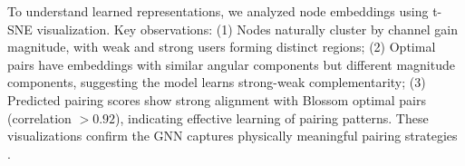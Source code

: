 To understand learned representations, we analyzed node embeddings using t-SNE visualization. Key observations: (1) Nodes naturally cluster by channel gain magnitude, with weak and strong users forming distinct regions; (2) Optimal pairs have embeddings with similar angular components but different magnitude components, suggesting the model learns strong-weak complementarity; (3) Predicted pairing scores show strong alignment with Blossom optimal pairs (correlation $> 0.92$), indicating effective learning of pairing patterns. These visualizations confirm the GNN captures physically meaningful pairing strategies \cite{shen2021graph}.
